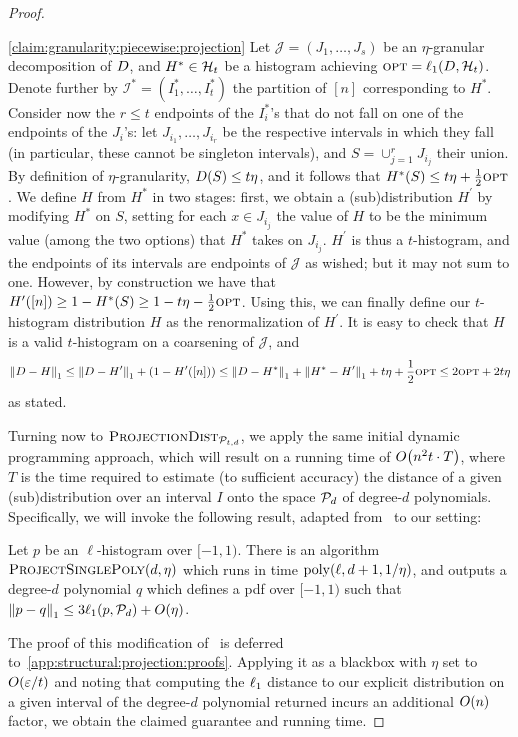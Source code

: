 \begin{proof}
\begin{proofof}{\cref{claim:granularity:piecewise:projection}} Let $\mathcal{J} =(J_1,\dots,J_s)$ be an $\eta$-granular decomposition of $\D$, and $H^\ast\in\classhist[t]$ be a histogram achieving $\opt=\lp[1](\D,\classhist[t])$. Denote further by $\mathcal{I^\ast} = (I^\ast_1,\dots,I^\ast_t)$ the partition of $[n]$ corresponding to $H^\ast$. Consider now the $r\leq t$ endpoints of the $I^\ast_i$'s that do not fall on one of the endpoints of the $J_i$'s: let $J_{i_1},\dots,J_{i_r}$ be the respective intervals in which they fall (in particular, these cannot be singleton intervals), and $S=\cup_{j=1}^r J_{i_j}$ their union. By definition of $\eta$-granularity, $\D(S) \leq t\eta$, and it follows that $H^\ast(S)\leq t\eta + \frac{1}{2}\opt$. We define $H$ from $H^\ast$ in two stages: first, we obtain a (sub)distribution $H^\prime$ by modifying $H^\ast$ on $S$, setting for each $x\in J_{i_j}$ the value of $H$ to be the minimum value (among the two options) that $H^\ast$ takes on $J_{i_j}$. $H^\prime$ is thus a $t$-histogram, and the endpoints of its intervals are endpoints of $\mathcal{J}$ as wished; but it may not sum to one. However, by construction we have that $H^\prime([n]) \geq 1-H^\ast(S) \geq 1-t\eta - \frac{1}{2}\opt$. Using this, we can finally define our $t$-histogram distribution $H$ as the renormalization of $H^\prime$. It is easy to check that $H$ is a valid $t$-histogram on a coarsening of $\mathcal{J}$, and
\[
    \normone{\D-H} \leq \normone{\D-H^\prime} + (1-H^\prime([n])) \leq \normone{\D-H^\ast} + \normone{H^\ast-H^\prime} + t\eta + \frac{1}{2}\opt \leq 2\opt  + 2t\eta
\]
as stated.
\end{proofof}

Turning now to $\estimdist[\classpoly]$, we apply the same initial dynamic programming approach, which will result on a running time of $\bigO{n^2t\cdot T}$, where $T$ is the time required to estimate (to sufficient accuracy) the distance of a given (sub)distribution over an interval $I$ onto the space $\classpoly[d]$ of degree-$d$ polynomials. Specifically, we will invoke the following result, adapted from~\cite{CDSS:14} to our setting:
\begin{theorem} \label{theo:degreed:poly-projection}
Let $p$ be an $\ell$-histogram over $[-1,1)$. There is an algorithm $\textsc{ProjectSinglePoly}(d,\eta)$
which runs in time $\poly(\ell, d+1,1/\eta)$, and outputs a degree-$d$ polynomial $q$ which defines a pdf over $[-1,1) $
such that $\normone{p-q} \leq 3 \lp[1](p,\classpoly[d]) + O(\eta)$.
\end{theorem}
The proof of this modification of~\cite[Theorem 9]{CDSS:14} is deferred to~\cref{app:structural:projection:proofs}. Applying it as a blackbox with $\eta$ set to $\bigO{\eps/t}$ and noting that computing the $\lp[1]$ distance to our explicit distribution on a given interval of the degree-$d$ polynomial returned incurs an additional $\bigO{n}$ factor, we obtain the claimed guarantee and running time.
\end{proof}

